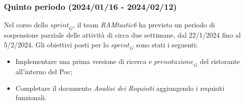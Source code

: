 \subsubsection{Quinto periodo (2024/01/16 - 2024/02/12)}
Nel corso dello $\textit{sprint}_G$, il team \emph{RAMtastic6} ha previsto un periodo di sospensione parziale delle attività di circa due settimane, dal 22/1/2024 fino al 5/2/2024.
Gli obiettivi posti per lo $\textit{sprint}_G$ sono stati i seguenti:
\begin{itemize}
    \item Implementare una prima versione di ricerca e $\textit{prenotazione}_G$ del ristorante all'interno del Poc;
    \item Completare il documento \emph{Analisi dei Requisiti} aggiungendo i requisiti funzionali.
\end{itemize}

